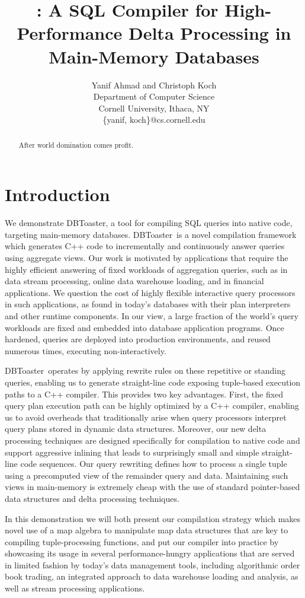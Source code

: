 \documentclass{vldb}
\title{\compiler: A SQL Compiler for High-Performance Delta Processing in
Main-Memory Databases}
\author{Yanif Ahmad and Christoph Koch \\
Department of Computer Science \\ Cornell University, Ithaca, NY \\
\{yanif, koch\}@cs.cornell.edu}
\date{}
\newcommand{\compiler}{DBToaster}
\begin{document}
\maketitle

\begin{abstract}
After world domination comes profit.
\end{abstract}


\section{Introduction}
We demonstrate \compiler, a tool for compiling SQL queries into native code,
targeting main-memory databases. \compiler\ is a novel compilation framework
which generates C++ code to incrementally and continuously answer queries using
aggregate views. Our work is motivated by applications that require the highly
efficient answering of fixed workloads of aggregation queries, such as in data
stream processing, online data warehouse loading, and in financial applications.
We question the cost of highly flexible interactive query processors in such
applications, as found in today's databases with their plan interpreters and
other runtime components. In our view, a large fraction of the world's query
workloads are fixed and embedded into database application programs. Once
hardened, queries are deployed into production environments, and re\-used
numerous times, executing non-interactively.

\compiler\ operates by applying rewrite rules on these repetitive or standing
queries, enabling us to generate straight-line code exposing tuple-based
execution paths to a C++ compiler. This provides two key advantages. First, the
fixed query plan execution path can be highly optimized by a C++ compiler,
enabling us to avoid overheads that traditionally arise when query processors
interpret query plans stored in dynamic data structures. Moreover, our new delta
processing techniques are designed specifically for compilation to native code
and support aggressive inlining that leads to surprisingly small and simple
straight-line code sequences. Our query rewriting defines how to process a single
tuple using a precomputed view of the remainder query and data. Maintaining such
views in main-memory is extremely cheap with the use of standard pointer-based
data structures and delta processing techniques.

In this demonstration we will both present our compilation strategy which makes
novel use of a map algebra to manipulate map data structures that are key to
compiling tuple-processing functions, and put our compiler into practice by
showcasing its usage in several performance-hungry applications that are served
in limited fashion by today's data management tools, including algorithmic order
book trading, an integrated approach to data warehouse loading and analysis, as
well as stream processing applications.
\end{document}
